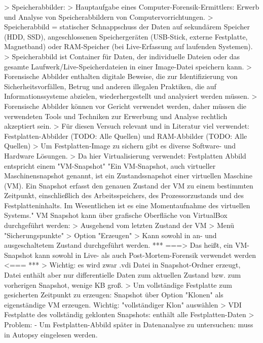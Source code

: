 > Speicherabbilder:
	> Hauptaufgabe eines Computer-Forensik-Ermittlers: Erwerb und Analyse von Speicherabbildern von Computervorrichtungen. \cite{Hassan.2019}
    > Speicherabbild = statischer Schnappschuss der Daten auf sekundärem Speicher (HDD, SSD), angeschlossenen Speichergeräten (USB-Stick, externe Festplatte, Magnetband) oder RAM-Speicher (bei Live-Erfassung auf laufenden Systemen). \cite{Hassan.2019}
    > Speicherabbild ist Container für Daten, der individuelle Dateien oder das gesamte Laufwerk/Live-Speicherdateien in einer Image-Datei speichern kann. \cite{Hassan.2019}
	> Forensische Abbilder enthalten digitale Beweise, die zur Identifizierung von Sicherheitsvorfällen, Betrug und anderen illegalen Praktiken, die auf Informationssysteme abzielen, wiederhergestellt und analysiert werden müssen. \cite{Hassan.2019}
	> Forensische Abbilder können vor Gericht verwendet werden, daher müssen die verwendeten Tools und Techniken zur Erwerbung und Analyse rechtlich akzeptiert sein. \cite{Hassan.2019}
	> Für diesen Versuch relevant und in Literatur viel verwendet: Festplatten-Abbilder (TODO: Alle Quellen) und RAM-Abbilder (TODO: Alle Quellen)
		> Um Festplatten-Image zu sichern gibt es diverse Software- und Hardware Lösungen. 
		> Da hier Virtualisierung verwendet: Festplatten Abbild entspricht einem "VM-Snapshot"
			"Ein VM-Snapshot, auch virtueller Maschinensnapshot genannt, ist ein Zustandssnapshot einer virtuellen Maschine (VM). Ein Snapshot erfasst den genauen Zustand der VM zu einem bestimmten Zeitpunkt, einschließlich des Arbeitsspeichers, des Prozessorzustands und des Festplatteninhalts. Im Wesentlichen ist es eine Momentaufnahme des virtuellen Systems." %
			VM Snapshot kann über grafische Oberfläche von VirtualBox durchgeführt werden:
				> Ausgehend vom letzten Zustand der VM > Menü "Sicherungspunkte" > Option "Erzeugen"
				> Kann sowohl in an- und ausgeschaltetem Zustand durchgeführt werden. 
					*** ===> Das heißt, ein VM-Snapshot kann sowohl in Live- als auch Post-Mortem-Forensik verwendet werden <=== ***
				> Wichtig: es wird zwar .vdi Datei in Snapshot-Ordner erzeugt, Datei enthält aber nur differentielle Daten zum aktuellen Zustand bzw. zum vorherigen Snapshot, wenige KB groß.
				> Um vollständige Festplatte zum gesicherten Zeitpunkt zu erzeugen: Snapshot über Option "Klonen" als eigenständige VM erzeugen. Wichtig: "vollständiger Klon" auswählen
				> VDI Festplatte des vollständig geklonten Snapshots: enthält alle Festplatten-Daten
		> Problem: 
			- Um Festplatten-Abbild später in Datenanalyse zu untersuchen: muss in Autopsy eingelesen werden. 
